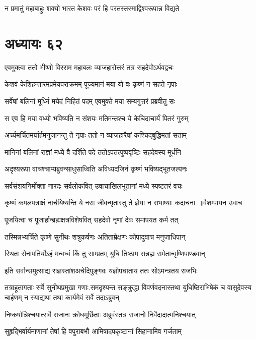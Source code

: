 \twolineshloka
{न प्रमातुं महाबाहुः शक्यो भारत केशवः}
{परं हि परतस्तस्माद्विश्वरूपान्न विद्यते}


\chapter{अध्यायः ६२}
\twolineshloka
{एवमुक्त्वा ततो भीष्णो विरराम महाबलः}
{व्याजहारोत्तरं तत्र सहदेवोऽर्थवद्वचः}


\twolineshloka
{केशवं केशिहन्तारमप्रमेयपराक्रमम्}
{पूज्यमानं मया यो वः कृष्णं न सहते नृपाः}


\twolineshloka
{सर्वेषां बलिनां मूर्ध्नि मयेदं निहितं पदम्}
{एवमुक्ते मया सम्यगुत्तरं प्रब्रवीतु सः}


\twolineshloka
{स एव हि मया वध्यो भविष्यति न संशयः}
{मतिमन्तश्च ये केचिदाचार्यं पितरं गुरुम्}


\twolineshloka
{अर्च्यमर्चितमर्घार्हमनुजानन्तु ते नृपाः}
{ततो न व्याजहारैषां कश्चिद्बुद्धिमतां सताम्}


\twolineshloka
{मानिनां बलिनां राज्ञां मध्ये वै दर्शिते पदे}
{ततोऽपतत्पुष्पवृष्टिः सहदेवस्य मूर्धनि}


\twolineshloka
{अदृश्यरूपा वाचश्चाप्यब्रुवन्साधुसाध्विति}
{अविध्यदजिनं कृष्णं भविष्यद्भूतजल्पनः}


\twolineshloka
{सर्वसंशयनिर्मोक्ता नारदः सर्वलोकवित्}
{उवाचाखिलभूतानां मध्ये स्पष्टतरं वचः}


\threelineshloka
{कृष्णं कमलपत्राक्षं नार्चयिष्यन्ति ये नराः}
{जीवन्मृतास्तु ते ज्ञेया न सभाष्याः कदाचना ॥वैशम्पायन उवाच}
{}


\twolineshloka
{पूजयित्वा च पूजार्हान्ब्रह्मक्षत्रविशेषवित्}
{सहदेवो नृणां देवः समापयत कर्म तत्}


\twolineshloka
{तस्मिन्नभ्यर्चिते कृष्णे सुनीथः शत्रुकर्षणः}
{अतिताम्रेक्षणः कोपादुवाच मनुजाधिपान्}


\twolineshloka
{स्थितः सेनापतिर्योऽहं मन्वध्वं किं तु साम्प्रतम्}
{युधि तिष्ठाम सन्नह्य समेतान्वृष्णिपाण्डवान्}


\twolineshloka
{इति सर्वान्समुत्साद्य राज्ञस्तांशअचेदिपुङ्गवः}
{यज्ञोपघाताय ततः सोऽमन्त्रतय राजभिः}


तत्राहूतागताः सर्वे सुनीथप्रमुखा गणाः.समदृश्यन्त सङ्क्रुद्धा विवर्णवदनास्तथा
\twolineshloka
{युधिष्ठिराभिषेकं च वासुदेवस्य चार्हणम्}
{न स्याद्यथा तथा कार्यमेवं सर्वे तदाऽब्रुवन्}


\twolineshloka
{निष्कर्षान्निश्चयात्सर्वे राजानः क्रोधमूर्छिताः}
{अब्रुवंस्तत्र राजानो निर्वेदादात्मनिश्चयात्}


\twolineshloka
{सुहृद्भिर्वार्यमाणानां तेषां हि वपुराबभौ}
{आमिषादपकृष्टानां सिहानामिव गर्जताम्}


